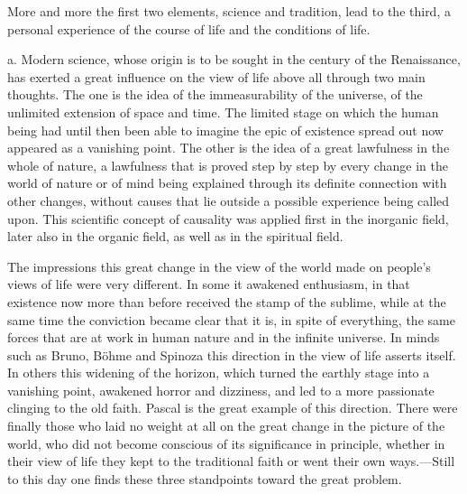 \documentclass[12pt]{article}
\newcommand{\opage}[1]{\marginnote{\footnotesize\textit{[#1]}}}
\begin{document}
More and more the first two elements, science and tradition, lead to the third,
a personal experience of the course of life and the conditions of life.

a. Modern science, whose origin is to be sought in the century of the
Renaissance, has exerted a great influence on the view of life above all through
two main thoughts. The one is the idea of the immeasurability of the universe,
of the unlimited extension of space and time. The limited stage on which the
human being had until then been able to imagine the epic of existence spread out
now appeared as a vanishing point. The other is the idea of a great lawfulness
in the whole of nature, a lawfulness that is proved step by step by every change
in the world of nature or of mind being explained through its definite
connection with other changes, without causes that lie outside a possible
experience being called upon. This scientific concept of causality was applied
first in the inorganic field, later also in the
\opage{62}%
organic field, as well as in the spiritual field.

The impressions this great change in the view of the world made on people's
views of life were very different. In some it awakened enthusiasm, in that
existence now more than before received the stamp of the sublime, while at the
same time the conviction became clear that it is, in spite of everything, the
same forces that are at work in human nature and in the infinite universe. In
minds such as Bruno, Böhme and Spinoza this direction in the view of life
asserts itself. In others this widening of the horizon, which turned the earthly
stage into a vanishing point, awakened horror and dizziness, and led to a more
passionate clinging to the old faith. Pascal is the great example of this
direction. There were finally those who laid no weight at all on the great
change in the picture of the world, who did not become conscious of its
significance in principle, whether in their view of life they kept to the
traditional faith or went their own ways.---Still to this day one finds these
three standpoints toward the great problem.
\end{document}
